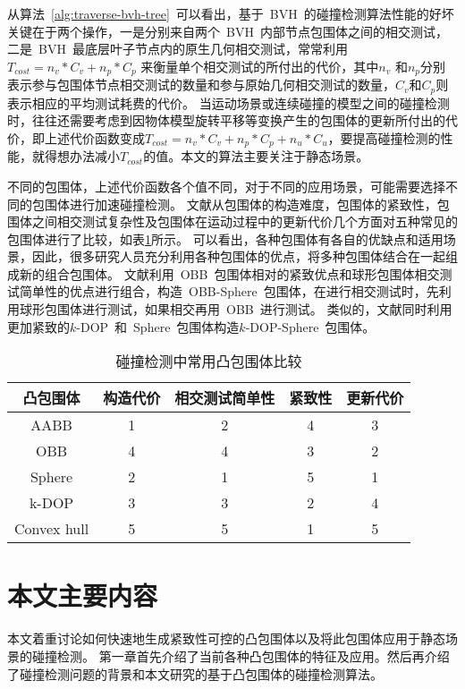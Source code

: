 从算法~\ref{alg:traverse-bvh-tree}~可以看出，基于~BVH~的碰撞检测算法性能的好坏关键在于两个操作，一是分别来自两个~BVH~内部节点包围体之间的相交测试，二是~BVH~最底层叶子节点内的原生几何相交测试，常常利用~$T_{cost}
= n_v * C_v + n_p * C_p$ 来衡量单个相交测试的所付出的代价，其中$n_v$
和$n_p$分别表示参与包围体节点相交测试的数量和参与原始几何相交测试的数量，$C_v$和$C_p$则表示相应的平均测试耗费的代价\cite{klosowski1998efficient}。
当运动场景或连续碰撞的模型之间的碰撞检测时，往往还需要考虑到因物体模型旋转平移等变换产生的包围体的更新所付出的代价，即上述代价函数变成$T_{cost}
= n_v * C_v + n_p * C_p + n_u *
C_u$，要提高碰撞检测的性能，就得想办法减小$T_{cost}$的值。本文的算法主要关注于静态场景。

不同的包围体，上述代价函数各个值不同，对于不同的应用场景，可能需要选择不同的包围体进行加速碰撞检测。
文献从包围体的构造难度，包围体的紧致性，包围体之间相交测试复杂性及包围体在运动过程中的更新代价几个方面对五种常见的包围体进行了比较，如表\ref{lbl:table:bv-comp}所示。
可以看出，各种包围体有各自的优缺点和适用场景，因此，很多研究人员充分利用各种包围体的优点，将多种包围体结合在一起组成新的组合包围体。
文献\cite{chang2010efficient}利用~OBB~包围体相对的紧致优点和球形包围体相交测试简单性的优点进行组合，构造~OBB-Sphere~包围体，在进行相交测试时，先利用球形包围体进行测试，如果相交再用~OBB~进行测试。
类似的，文献\cite{zhigang2010efficient}同时利用更加紧致的$k$-DOP~和~Sphere~包围体构造$k$-DOP-Sphere~包围体。

\begin{table}[H]
\centering
\caption{碰撞检测中常用凸包围体比较}
\begin{tabular*}{13cm}{ccccc}
\toprule[1.2pt]
凸包围体 & 构造代价 & 相交测试简单性 & 紧致性 & 更新代价\\
\midrule[1pt]
AABB   & 1 & 2 & 4 & 3\\
OBB    & 4 & 4 & 3 & 2\\
Sphere & 2 & 1 & 5 & 1\\
k-DOP  & 3 & 3 & 2 & 4\\
Convex hull & 5 & 5 & 1 & 5 \\
\bottomrule[1.2pt]
\end{tabular*}
\label{lbl:table:bv-comp}
\end{table}


\section{本文主要内容}
\label{sec:structure}
本文着重讨论如何快速地生成紧致性可控的凸包围体以及将此包围体应用于静态场景的碰撞检测。
第一章首先介绍了当前各种凸包围体的特征及应用。然后再介绍了碰撞检测问题的背景和本文研究的基于凸包围体的碰撞检测算法。

